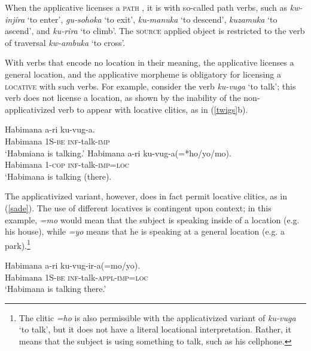 \documentclass[output=paper]{langsci/langscibook}
\begin{document}
When the applicative licenses a {\scshape path} , it is with so-called path verbs, such as \emph{kw-injira} `to enter', \emph{gu-sohoka} `to exit', \emph{ku-manuka} `to descend', \emph{kuzamuka} `to ascend', and \emph{ku-rira} `to climb'. The {\scshape source} applied object is restricted to the verb of traversal \emph{kw-ambuka} `to cross'.


With verbs that encode no location in their meaning, the applicative licenses a general location, and the applicative morpheme is obligatory for licensing a {\scshape locative} with such verbs. For example, consider the verb \emph{ku-vuga} `to talk'; this verb does not license a location, as shown by the inability of the non-applicativized verb to appear with locative clitics, as in (\ref{twigs}b). 

\begin{exe}
      \ex\label{twigs}\begin{xlist}
	      \ex\gll Habimana a-ri ku-vug-a.\\	
			      Habimana 1S-{\scshape be} {\scshape inf}-talk-{\scshape imp}\\
			      \glt `Habmiana is talking.'
      \ex\gll Habimana  a-ri ku-vug-a(=*ho/yo/mo).\\
					      Habimana {\scshape 1-cop} {\scshape inf-}talk-{\scshape imp=loc}\\
					      \glt `Habimana is talking (there).
\end{xlist}
\end{exe}
%
The applicativized variant, however, does in fact permit locative clitics, as in (\ref{sade}). The use of different locatives is contingent upon context; in this example, \emph{=mo} would mean that the subject is speaking inside of a location (e.g. his house), while \emph{=yo} means that he is speaking at a general location (e.g. a park).\footnote{The clitic \emph{=ho} is also permissible with the applicativized variant of \emph{ku-vuga} `to talk', but it does not have a literal locational interpretation. Rather, it means that the subject is using something to talk, such as his cellphone.}

\begin{exe}
	      \ex\label{sade}\gll Habimana a-ri ku-vug-ir-a(=mo/yo).\\
		      Habimana 1S-{\scshape be} {\scshape inf}-talk-{\scshape appl-imp=loc}\\
			      \glt `Habimana is talking there.' 
      \end{exe}
\end{document}
